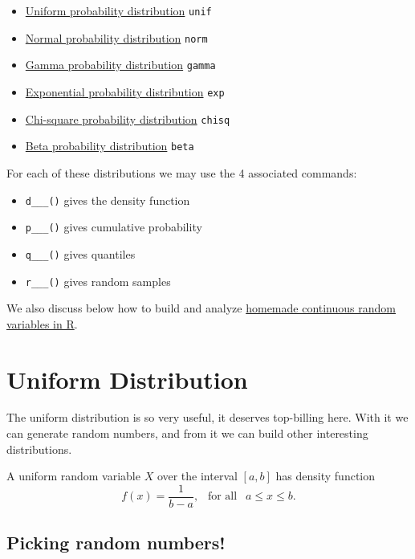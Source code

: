 \documentclass[
]{book}
\providecommand{\tightlist}{%
  \setlength{\itemsep}{0pt}\setlength{\parskip}{0pt}}
\theoremstyle{definition}
\theoremstyle{definition}
\theoremstyle{definition}
\theoremstyle{definition}
\theoremstyle{remark}
\begin{document}
\begin{itemize}
\tightlist
\item
  \hyperref[unifR]{Uniform probability distribution} \textbar{} \texttt{unif}
\item
  \hyperref[normalR]{Normal probability distribution} \textbar{} \texttt{norm}
\item
  \hyperref[gammaR]{Gamma probability distribution} \textbar{} \texttt{gamma}
\item
  \hyperref[expR]{Exponential probability distribution} \textbar{} \texttt{exp}
\item
  \hyperref[chiR]{Chi-square probability distribution} \textbar{} \texttt{chisq}
\item
  \hyperref[betaR]{Beta probability distribution} \textbar{} \texttt{beta}
\end{itemize}

For each of these distributions we may use the 4 associated commands:

\begin{itemize}
\tightlist
\item
  \texttt{d\_\_\_()} gives the density function
\item
  \texttt{p\_\_\_()} gives cumulative probability
\item
  \texttt{q\_\_\_()} gives quantiles
\item
  \texttt{r\_\_\_()} gives random samples
\end{itemize}

We also discuss below how to build and analyze \hyperref[customR]{homemade continuous random variables in R}.

\section{Uniform Distribution}\label{unifR}

The uniform distribution is so very useful, it deserves top-billing here. With it we can generate random numbers, and from it we can build other interesting distributions.

A uniform random variable \(X\) over the interval \([a,b]\) has density function \[f(x) = \frac{1}{b-a}, ~~\text{ for all }~~ a \leq x \leq b.\]

\subsection{Picking random numbers!}\label{picking-random-numbers}
\end{document}
